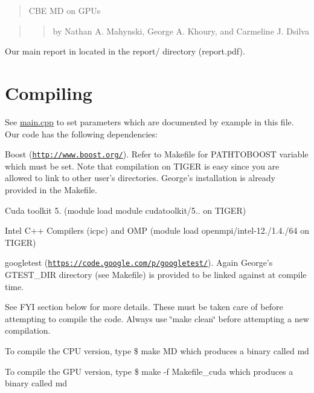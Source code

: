 \begin{quotation}
C\-B\-E M\-D on G\-P\-Us

\end{quotation}


\begin{quotation}
\begin{quotation}
by Nathan A. Mahynski, George A. Khoury, and Carmeline J. Dsilva

\end{quotation}


\end{quotation}


Our main report in located in the report/ directory (report.\-pdf).

\section*{Compiling}

See \hyperlink{main_8cpp_source}{main.\-cpp} to set parameters which are documented by example in this file. Our code has the following dependencies\-:


\begin{DoxyEnumerate}
\item Boost (\href{http://www.boost.org/}{\tt http\-://www.\-boost.\-org/}). Refer to Makefile for P\-A\-T\-H\-T\-O\-B\-O\-O\-S\-T variable which must be set. Note that compilation on T\-I\-G\-E\-R is easy since you are allowed to link to other user's directories. George's installation is already provided in the Makefile.
\item Cuda toolkit 5. (module load module cudatoolkit/5.. on T\-I\-G\-E\-R)
\item Intel C++ Compilers (icpc) and O\-M\-P (module load openmpi/intel-\/12./1.4./64 on T\-I\-G\-E\-R)
\item googletest (\href{https://code.google.com/p/googletest/}{\tt https\-://code.\-google.\-com/p/googletest/}). Again George's G\-T\-E\-S\-T\-\_\-\-D\-I\-R directory (see Makefile) is provided to be linked against at compile time.
\end{DoxyEnumerate}

See F\-Y\-I section below for more details. These must be taken care of before attempting to compile the code. Always use \char`\"{}make clean\char`\"{} before attempting a new compilation.

To compile the C\-P\-U version, type \$ make M\-D which produces a binary called md

To compile the G\-P\-U version, type \$ make -\/f Makefile\-\_\-cuda which produces a binary called md

